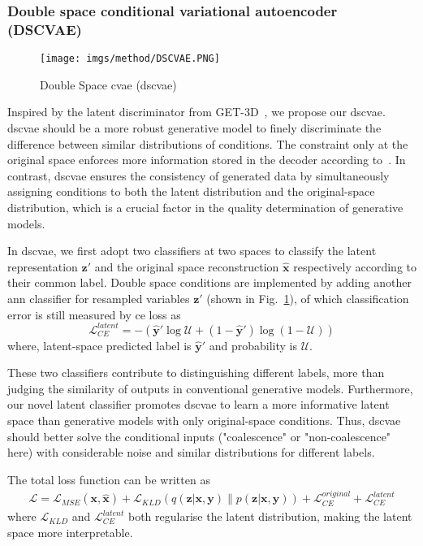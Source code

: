 \documentclass[twoside,twocolumn,9pt]{article}
\begin{document}
\subsubsection{Double space conditional variational autoencoder (DSCVAE)}\label{mtd:dscvae}
\begin{figure}[t]
  \centering
  \texttt{[image: imgs/method/DSCVAE.PNG]}  \caption{Double Space \acrshort*{cvae} (\acrshort*{dscvae})}\label{fig:dscvae}
\end{figure}
Inspired by the latent discriminator from GET-3D~\cite{gao2022get3d}, we propose our \acrshort*{dscvae}. 
%
\acrshort*{dscvae} should be a more robust generative model to finely discriminate the difference between similar distributions of conditions. The constraint only at the original space enforces more information stored in the decoder according to~\cite{he2022masked}. In contrast, \acrshort*{dscvae} ensures the consistency of generated data by simultaneously assigning conditions to both the latent distribution and the original-space distribution, which is a crucial factor in the quality determination of generative models. 

In \acrshort*{dscvae}, we first adopt two classifiers at two spaces to classify the latent representation $\mathbf{z'}$ and the original space reconstruction $\mathbf{\hat{x}}$ respectively according to their common label. Double space conditions are implemented by adding another \acrshort*{ann} classifier for resampled variables $\mathbf{z'}$ (shown in Fig.~\ref{fig:dscvae}), of which classification error is still measured by \acrshort*{ce} loss as
\begin{equation}
\mathcal{L}_{CE}^{latent} = -(\mathbf{\hat{y}'} \log \mathcal{U}+(1-\mathbf{\hat{y}'}) \log (1-\mathcal{U}))
\end{equation}
where, latent-space predicted label is $\mathbf{\hat{y}'}$ and probability is $\mathcal{U}$. 

These two classifiers contribute to distinguishing different labels, more than judging the similarity of outputs in conventional generative models. Furthermore, our novel latent classifier promotes \acrshort*{dscvae} to learn a more informative latent space than generative models with only original-space conditions. Thus, \acrshort*{dscvae} should better solve the conditional inputs ("coalescence" or "non-coalescence" here) with considerable noise and similar distributions for different labels. 

The total loss function can be written as
\begin{align}
   \mathcal{L} = \mathcal{L}_{MSE}(\mathbf{x}, \hat{\mathbf{x}}) + \mathcal{L}_{KLD}(q(\mathbf{z|x,y}) \| p(\mathbf{z|x,y})) + \mathcal{L}_{CE}^{original} + \mathcal{L}_{CE}^{latent}
\end{align}
where $\mathcal{L}_{KLD}$ and $\mathcal{L}_{CE}^{latent}$  both regularise the latent distribution, making the latent space more interpretable. 
\end{document}
